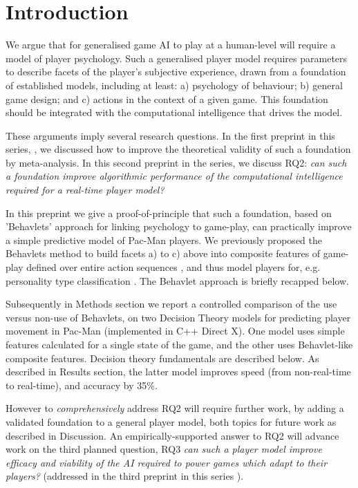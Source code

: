 \documentclass[conference]{IEEEtran}
\begin{document}
\section{Introduction}
\label{intro}
We argue that for generalised game AI to play at a human-level will require a model of player psychology.
Such a generalised player model requires parameters to describe facets of the player's subjective experience, drawn from a foundation of established models, including at least: \textsf{a}) psychology of behaviour; \textsf{b}) general game design; and \textsf{c}) actions in the context of a given game. This foundation should be integrated with the computational intelligence that drives the model.

These arguments imply several research questions. In the first preprint in this series, \cite{Cowley2016pre1}, we discussed how to improve the theoretical validity of such a foundation by meta-analysis. In this second preprint in the series, we discuss \textsf{RQ2}: \textit{can such a foundation improve algorithmic performance of the computational intelligence required for a real-time player model?}

In this preprint we give a proof-of-principle that such a foundation, based on 'Behavlets' approach for linking psychology to game-play, can practically improve a simple predictive model of Pac-Man players. We previously proposed the Behavlets method to build facets \textsf{a}) to \textsf{c}) above into composite features of game-play defined over entire action sequences \cite{Cowley2016behavlet}, and thus model players for, e.g. personality type classification \cite{Cowley2013}. The Behavlet approach is briefly recapped below.

Subsequently in Methods section we report a controlled comparison of the use versus non-use of Behavlets, on two Decision Theory models for predicting player movement in Pac-Man (implemented in C++ Direct X). One model uses simple features calculated for a single state of the game, and the other uses Behavlet-like composite features. Decision theory fundamentals are described below. As described in Results section, the latter model improves speed (from non-real-time to real-time), and accuracy by 35\%.

However to \textit{comprehensively} address \textsf{RQ2} will require further work, by adding a validated foundation to a general player model, both topics for future work as described in Discussion. An empirically-supported answer to \textsf{RQ2} will advance work on the third planned question, \textsf{RQ3} \textit{can such a player model improve efficacy and viability of the AI required to power games which adapt to their players?} (addressed in the third preprint in this series \cite{Cowley2016prep3}).
\end{document}
